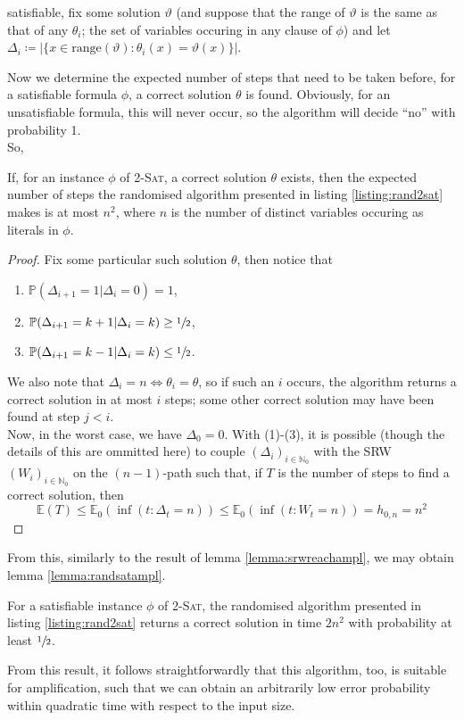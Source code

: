 	satisfiable, fix some solution $\vartheta$ (and suppose that the range of $\vartheta$ is 
	the same as that of any $\theta_i$; the set of variables occuring in any clause of $\phi$) 
	and let $\Delta_i\coloneqq|\{x\in\mathrm{range}(\vartheta):\theta_i(x)=\vartheta(x)\}|$.
	\par
	Now we determine the expected number of steps that need to be taken before, for a 
	satisfiable formula $\phi$, a correct solution $\theta$ is found. Obviously, for an 
	unsatisfiable formula, this will never occur, so the algorithm will decide ``no'' with 
	probability 1. 
	\\
	So,
	\begin{claim}
		If, for an instance $\phi$ of 2-\textsc{Sat}, a correct solution $\theta$ exists, 
		then the expected number of steps the randomised algorithm presented in listing 
		\ref{listing:rand2sat} makes is at most $n^2$, where $n$ is the number of distinct 
		variables occuring as literals in $\phi$.
	\end{claim}
	\begin{proof}
		Fix some particular such solution $\theta$, then notice that 
		\begin{enumerate}[(1)]
			\item $\mathbb{P}(\Delta_{i+1} = 1 | \Delta_i = 0) = 1$,
			\item $\mathbb{P}(\Delta_{i+1} = k+1 | \Delta_i = k) \geq \sfrac{1}{2}$,
			\item $\mathbb{P}(\Delta_{i+1} = k-1 | \Delta_i = k) \leq \sfrac{1}{2}$.
		\end{enumerate}
		We also note that $\Delta_i = n \iff \theta_i = \theta$, so if such an $i$ occurs,
		the algorithm returns a correct solution in at most $i$ steps; some other correct 
		solution may have been found at step $j < i$. \\
		Now, in the worst case, we have $\Delta_0 = 0$. With (1)-(3), it is possible 
		(though the details of this are ommitted here) to couple $(\Delta_i)_{i\in
		\mathbb{N}_0}$ with the SRW $(W_i)_{i\in\mathbb{N}_0}$ on the $(n-1)$-path such 
		that, if $T$ is the number of steps to find a correct solution, then 
		$$
			\mathbb{E}(T) \leq \mathbb{E}_0(\inf(t : \Delta_t = n)) 
			\leq  \mathbb{E}_0(\inf(t : W_t = n)) 
			= h_{0,n} = n^2
		$$
	\end{proof}
	From this, similarly to the result of lemma \ref{lemma:srwreachampl}, we may obtain 
	lemma \ref{lemma:randsatampl}.
	\begin{lemma}
		\label{lemma:randsatampl}
		For a satisfiable instance $\phi$ of 2-\textsc{Sat}, the randomised algorithm 
		presented in listing \ref{listing:rand2sat} returns a correct solution in time 
		$2n^2$ with probability at least $\sfrac{1}{2}$.
	\end{lemma}
	From this result, it follows straightforwardly that this algorithm, too, is suitable for 
	amplification, such that we can obtain an arbitrarily low error probability within 
	quadratic time with respect to the input size.
